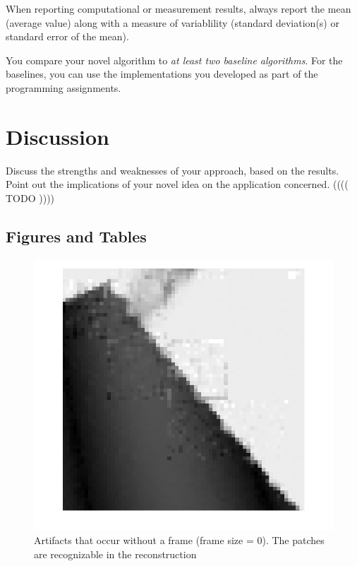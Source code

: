 \documentclass[10pt,conference,compsocconf]{IEEEtran}
\begin{document}
When reporting computational or measurement results, always
report the mean (average value) along with a measure of variablility
(standard deviation(s) or standard error of the mean).

You compare your novel algorithm to \emph{at least two baseline
  algorithms}. For the baselines, you can use the implementations you
developed as part of the programming assignments.

\section{Discussion}
  Discuss the strengths and weaknesses of your
  approach, based on the results. Point out the implications of your  
  novel idea on the application concerned. (((( TODO ))))


\subsection{Figures and Tables}


\begin{figure}[tbp]
  \centering
  \includegraphics[width=\columnwidth]{images/boundaryArtifact_noframe}
  \caption{Artifacts that occur without a frame (frame size = 0). The patches are recognizable in the reconstruction}
  \label{fig:boundaryArtifacts}
\end{figure}
\end{document}
